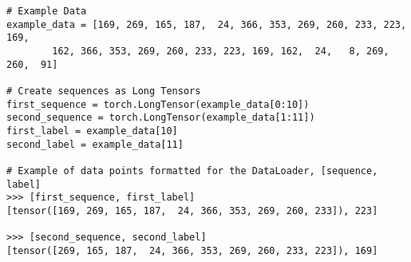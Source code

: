 \begin{lstlisting}
# Example Data
example_data = [169, 269, 165, 187,  24, 366, 353, 269, 260, 233, 223, 169, 
        162, 366, 353, 269, 260, 233, 223, 169, 162,  24,   8, 269, 260,  91]

# Create sequences as Long Tensors
first_sequence = torch.LongTensor(example_data[0:10])
second_sequence = torch.LongTensor(example_data[1:11])
first_label = example_data[10]
second_label = example_data[11]

# Example of data points formatted for the DataLoader, [sequence, label]
>>> [first_sequence, first_label]
[tensor([169, 269, 165, 187,  24, 366, 353, 269, 260, 233]), 223] 

>>> [second_sequence, second_label]
[tensor([269, 165, 187,  24, 366, 353, 269, 260, 233, 223]), 169]
\end{lstlisting}


